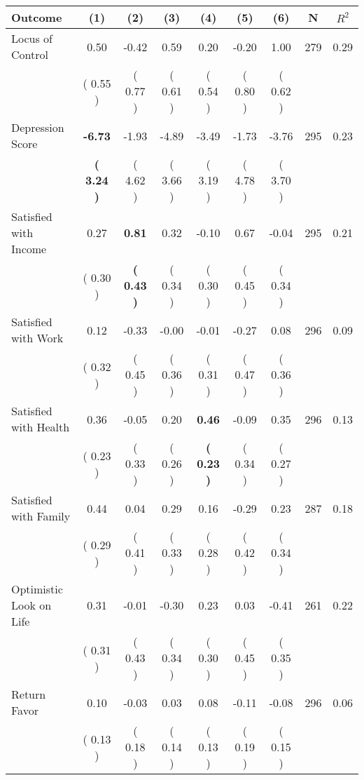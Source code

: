 \begin{tabular}{lcccccccc}
\toprule
 \textbf{Outcome} & \textbf{(1)} & \textbf{(2)} & \textbf{(3)} & \textbf{(4)} & \textbf{(5)} & \textbf{(6)} & \textbf{N} & \textbf{$ R^2$} \\
\midrule
Locus of Control &      0.50 &     -0.42 &      0.59 &      0.20 &     -0.20 &      1.00 & 279 &       0.29 \\ 
 & (     0.55 ) & (     0.77 ) & (     0.61 ) & (     0.54 ) & (     0.80 ) & (     0.62 ) & \\
Depression Score & \textbf{    -6.73} &     -1.93 &     -4.89 &     -3.49 &     -1.73 &     -3.76 & 295 &       0.23 \\ 
 & \textbf{(     3.24 )} & (     4.62 ) & (     3.66 ) & (     3.19 ) & (     4.78 ) & (     3.70 ) & \\
Satisfied with Income &      0.27 & \textbf{     0.81} &      0.32 &     -0.10 &      0.67 &     -0.04 & 295 &       0.21 \\ 
 & (     0.30 ) & \textbf{(     0.43 )} & (     0.34 ) & (     0.30 ) & (     0.45 ) & (     0.34 ) & \\
Satisfied with Work &      0.12 &     -0.33 &     -0.00 &     -0.01 &     -0.27 &      0.08 & 296 &       0.09 \\ 
 & (     0.32 ) & (     0.45 ) & (     0.36 ) & (     0.31 ) & (     0.47 ) & (     0.36 ) & \\
Satisfied with Health &      0.36 &     -0.05 &      0.20 & \textbf{     0.46} &     -0.09 &      0.35 & 296 &       0.13 \\ 
 & (     0.23 ) & (     0.33 ) & (     0.26 ) & \textbf{(     0.23 )} & (     0.34 ) & (     0.27 ) & \\
Satisfied with Family &      0.44 &      0.04 &      0.29 &      0.16 &     -0.29 &      0.23 & 287 &       0.18 \\ 
 & (     0.29 ) & (     0.41 ) & (     0.33 ) & (     0.28 ) & (     0.42 ) & (     0.34 ) & \\
Optimistic Look on Life &      0.31 &     -0.01 &     -0.30 &      0.23 &      0.03 &     -0.41 & 261 &       0.22 \\ 
 & (     0.31 ) & (     0.43 ) & (     0.34 ) & (     0.30 ) & (     0.45 ) & (     0.35 ) & \\
Return Favor &      0.10 &     -0.03 &      0.03 &      0.08 &     -0.11 &     -0.08 & 296 &       0.06 \\ 
 & (     0.13 ) & (     0.18 ) & (     0.14 ) & (     0.13 ) & (     0.19 ) & (     0.15 ) & \\

\end{tabular}
